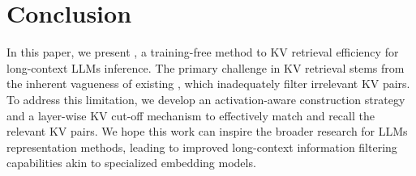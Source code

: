 \section{Conclusion}


In this paper,  we present \name, a training-free method to KV retrieval efficiency for long-context LLMs inference. The primary challenge in KV retrieval stems from the inherent vagueness  of existing \pq, which inadequately filter irrelevant KV pairs. To address this limitation, we develop an activation-aware \pq construction strategy and a layer-wise KV cut-off mechanism to effectively match and recall  the relevant KV pairs. We hope this work can inspire the broader research for  LLMs representation methods, leading to improved long-context information filtering capabilities akin to specialized embedding models.
